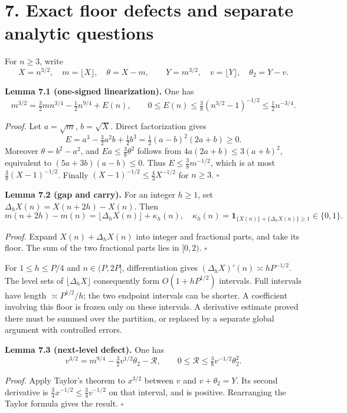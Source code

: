 \documentclass[11pt,a4paper]{article}
\begin{document}
\section{7. Exact floor defects and separate analytic
questions}\label{exact-floor-defects-and-separate-analytic-questions}

For \(n\ge3\), write \[
X=n^{3/2},\quad m=\lfloor X\rfloor,\quad\theta=X-m,
\qquad Y=m^{3/2},\quad v=\lfloor Y\rfloor,\quad\theta_2=Y-v.
\]


\textbf{Lemma 7.1 (one-signed linearization).} One has \[
m^{3/2}=\tfrac32mn^{3/4}-\tfrac12n^{9/4}+E(n),
\qquad
0\le E(n)\le\tfrac38(n^{3/2}-1)^{-1/2}\le\tfrac12n^{-3/4}.
\]

\emph{Proof.} Let \(a=\sqrt m\), \(b=\sqrt X\). Direct factorization
gives \[
E=a^3-\tfrac32a^2b+\tfrac12b^3
=\tfrac12(a-b)^2(2a+b)\ge0.
\] Moreover \(\theta=b^2-a^2\), and \(Ea\le\tfrac38\theta^2\) follows
from \(4a(2a+b)\le3(a+b)^2\), equivalent to \((5a+3b)(a-b)\le0\). Thus
\(E\le\tfrac38m^{-1/2}\), which is at most \(\tfrac38(X-1)^{-1/2}\).
Finally \((X-1)^{-1/2}\le\tfrac43X^{-1/2}\) for \(n\ge3\). \(\square\)


\textbf{Lemma 7.2 (gap and carry).} For an integer \(h\ge1\), set
\(\Delta_hX(n)=X(n+2h)-X(n)\). Then \[
m(n+2h)-m(n)=\lfloor\Delta_hX(n)\rfloor+\kappa_h(n),
\quad
\kappa_h(n)=\mathbf1_{\{X(n)\}+\{\Delta_hX(n)\}\ge1}\in\{0,1\}.
\]

\emph{Proof.} Expand \(X(n)+\Delta_hX(n)\) into integer and fractional
parts, and take its floor. The sum of the two fractional parts lies in
\([0,2)\). \(\square\)

For \(1\le h\le P/4\) and \(n\in(P,2P]\), differentiation gives
\((\Delta_hX)'(n)\asymp hP^{-1/2}\). The level sets of
\(\lfloor\Delta_hX\rfloor\) consequently form \(O(1+hP^{1/2})\)
intervals. Full intervals have length \(\asymp P^{1/2}/h\); the two
endpoint intervals can be shorter. A coefficient involving this floor is
frozen only on these intervals. A derivative estimate proved there must
be summed over the partition, or replaced by a separate global argument
with controlled errors.


\textbf{Lemma 7.3 (next-level defect).} One has \[
v^{3/2}=m^{9/4}-\tfrac32v^{1/2}\theta_2-\mathcal R,
\qquad 0\le\mathcal R\le\tfrac38v^{-1/2}\theta_2^2.
\]

\emph{Proof.} Apply Taylor's theorem to \(x^{3/2}\) between \(v\) and
\(v+\theta_2=Y\). Its second derivative is
\(\tfrac34x^{-1/2}\le\tfrac34v^{-1/2}\) on that interval, and is
positive. Rearranging the Taylor formula gives the result. \(\square\)
\end{document}
